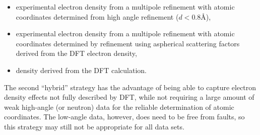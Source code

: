 \begin{refsection}
\begin{itemize}
    \item experimental electron density from a multipole refinement with atomic coordinates determined from high angle refinement ($d < 0.8$\AA),
    \item experimental electron density from a multipole refinement with atomic coordinates determined by refinement using aspherical scattering factors derived from the DFT electron density,
    \item density derived from the DFT calculation.
\end{itemize}

The second ``hybrid'' strategy has the advantage of being able to capture electron density effects not fully described by DFT, while not requiring a large amount of weak high-angle (or neutron) data for the reliable determination of atomic coordinates.
The low-angle data, however, does need to be free from faults, so this strategy may still not be appropriate for all data sets.


\end{refsection}
